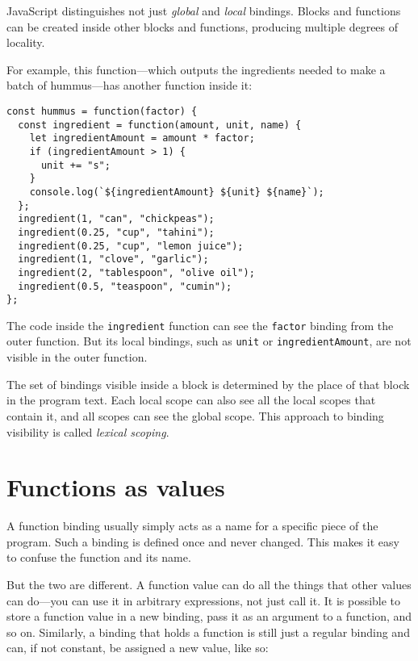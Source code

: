 JavaScript distinguishes not just \emph{global} and \emph{local} bindings. Blocks and functions can be created inside other blocks and functions, producing multiple degrees of locality.

For example, this function—which outputs the ingredients needed to make a batch of hummus—has another function inside it:

\begin{lstlisting}
const hummus = function(factor) {
  const ingredient = function(amount, unit, name) {
    let ingredientAmount = amount * factor;
    if (ingredientAmount > 1) {
      unit += "s";
    }
    console.log(`${ingredientAmount} ${unit} ${name}`);
  };
  ingredient(1, "can", "chickpeas");
  ingredient(0.25, "cup", "tahini");
  ingredient(0.25, "cup", "lemon juice");
  ingredient(1, "clove", "garlic");
  ingredient(2, "tablespoon", "olive oil");
  ingredient(0.5, "teaspoon", "cumin");
};
\end{lstlisting}
\noindent{}

The code inside the \lstinline`ingredient` function can see the \lstinline`factor` binding from the outer function. But its local bindings, such as \lstinline`unit` or \lstinline`ingredientAmount`, are not visible in the outer function.

The set of bindings visible inside a block is determined by the place of that block in the program text. Each local scope can also see all the local scopes that contain it, and all scopes can see the global scope. This approach to binding visibility is called \emph{lexical scoping}.

\section{Functions as values}

A function binding usually simply acts as a name for a specific piece of the program. Such a binding is defined once and never changed. This makes it easy to confuse the function and its name.

But the two are different. A function value can do all the things that other values can do—you can use it in arbitrary expressions, not just call it. It is possible to store a function value in a new binding, pass it as an argument to a function, and so on. Similarly, a binding that holds a function is still just a regular binding and can, if not constant, be assigned a new value, like so:

